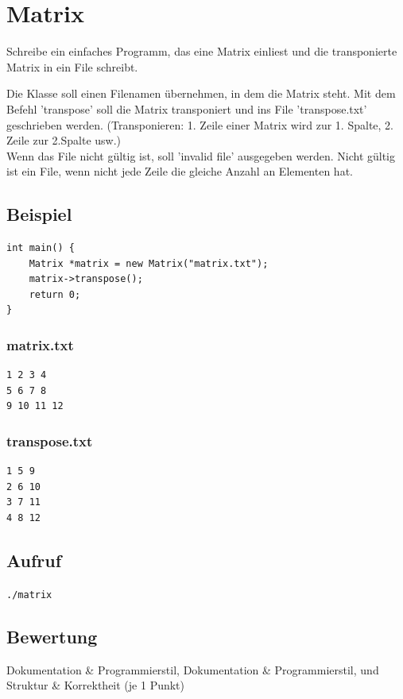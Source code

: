 \documentclass[a4paper,10pt]{article}
\begin{document}
\section*{Matrix}

Schreibe ein einfaches Programm, das eine Matrix einliest und die transponierte Matrix in ein File schreibt. 

Die Klasse soll einen Filenamen übernehmen, in dem die Matrix steht. Mit dem Befehl 'transpose' soll die Matrix transponiert und ins File 'transpose.txt' geschrieben werden. (Transponieren: 1. Zeile einer Matrix wird zur 1. Spalte, 2. Zeile zur 2.Spalte usw.)\\
Wenn das File nicht gültig ist, soll 'invalid file' ausgegeben werden. Nicht gültig ist ein File, wenn nicht jede Zeile die gleiche Anzahl an Elementen hat.

\subsection*{Beispiel}
\begin{verbatim}
int main() {
    Matrix *matrix = new Matrix("matrix.txt");
    matrix->transpose();
    return 0;
}
\end{verbatim}
\subsubsection*{matrix.txt} 
\begin{verbatim}
1 2 3 4
5 6 7 8
9 10 11 12
\end{verbatim}
\subsubsection*{transpose.txt} 
\begin{verbatim}
1 5 9 
2 6 10 
3 7 11 
4 8 12 
\end{verbatim}
\subsection*{Aufruf}
\texttt{./matrix}

\subsection*{Bewertung}
Dokumentation \& Programmierstil,  Dokumentation \& Programmierstil, und Struktur \& Korrektheit (je 1 Punkt)
\newpage
\end{document}
